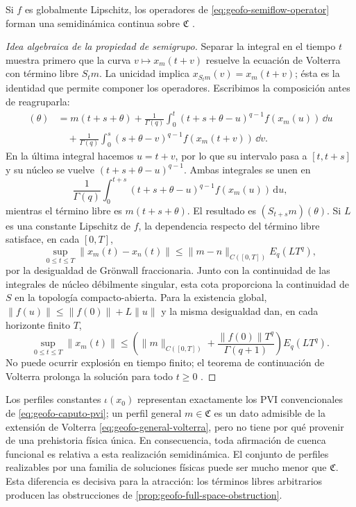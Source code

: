 \begin{proposition}
Si \(f\) es globalmente Lipschitz, los operadores de
\cref{eq:geofo-semiflow-operator} forman una semidinámica continua sobre
\(\mathfrak C\) \cite{DoanKloeden2021Semidynamical}.
\end{proposition}

\begin{proof}[Idea algebraica de la propiedad de semigrupo]
Separar la integral en el tiempo \(t\) muestra primero que la curva
\(v\mapsto x_m(t+v)\) resuelve la ecuación de Volterra con término libre
\(S_tm\). La unicidad implica
\(x_{S_tm}(v)=x_m(t+v)\); ésta es la identidad que permite componer los
operadores.
Escribimos la composición antes de reagruparla:
\begin{align*}
 [S_s(S_tm)](\theta)
 &=m(t+s+\theta)+\frac1{\Gamma(q)}\int_0^t
   (t+s+\theta-u)^{q-1}f(x_m(u))\,\dd u\\
 &\quad+\frac1{\Gamma(q)}\int_0^s
   (s+\theta-v)^{q-1}f(x_m(t+v))\,\dd v.
\end{align*}
En la última integral hacemos \(u=t+v\), por lo que su intervalo pasa a
\([t,t+s]\) y su núcleo se vuelve
\((t+s+\theta-u)^{q-1}\). Ambas integrales se unen en
\begin{equation*}
 \frac1{\Gamma(q)}\int_0^{t+s}
 (t+s+\theta-u)^{q-1}f(x_m(u))\,\mathrm du,
\end{equation*}
mientras el término libre es \(m(t+s+\theta)\). El resultado es
\((S_{t+s}m)(\theta)\). Si \(L\) es una constante Lipschitz de \(f\),
la dependencia respecto del término libre satisface, en cada \([0,T]\),
\[
 \sup_{0\leq t\leq T}\|x_m(t)-x_n(t)\|
 \leq\|m-n\|_{C([0,T])}E_q(LT^q),
\]
por la desigualdad de Grönwall fraccionaria. Junto con la continuidad de las
integrales de núcleo débilmente singular, esta cota proporciona la
continuidad de \(S\) en la topología compacto-abierta. Para la existencia
global, \(\|f(u)\|\le\|f(0)\|+L\|u\|\) y la misma desigualdad dan,
en cada horizonte finito \(T\),
\[
 \sup_{0\le t\le T}\|x_m(t)\|
 \le\left(\|m\|_{C([0,T])}
       +\frac{\|f(0)\|T^q}{\Gamma(q+1)}\right)E_q(LT^q).
\]
No puede ocurrir explosión en tiempo finito; el teorema de continuación de
Volterra prolonga la solución para todo \(t\ge0\)
\cite{DoanKloeden2021Semidynamical}.
\end{proof}

Los perfiles constantes
\(\iota(x_0)\) representan exactamente los PVI convencionales de
\cref{eq:geofo-caputo-pvi}; un perfil general \(m\in\mathfrak C\) es un dato
admisible de la extensión de Volterra
\cref{eq:geofo-general-volterra}, pero no tiene por qué provenir de una
prehistoria física única. En consecuencia, toda afirmación de cuenca funcional
es relativa a esta realización semidinámica. El conjunto de perfiles
realizables por una familia de soluciones físicas puede ser mucho menor que
\(\mathfrak C\). Esta diferencia es decisiva para la atracción: los
términos libres arbitrarios producen las obstrucciones de
\cref{prop:geofo-full-space-obstruction}.

